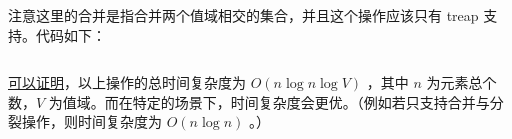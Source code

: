 注意这里的合并是指合并两个值域相交的集合，并且这个操作应该只有 treap 支持。代码如下：
\inputminted{cpp}{src/data structure/treap-merge.cpp}
\href{https://codeforces.com/blog/entry/108601}{可以证明}，以上操作的总时间复杂度为 $O(n\log n\log V)$ ，其中 $n$ 为元素总个数，$V$ 为值域。而在特定的场景下，时间复杂度会更优。（例如若只支持合并与分裂操作，则时间复杂度为 $O(n\log n)$ 。）